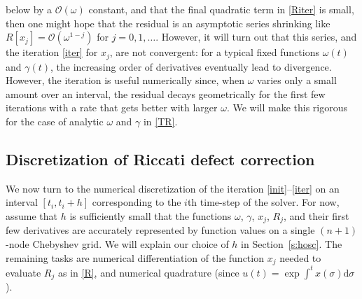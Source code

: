 \documentclass[10pt]{article}
\newcommand{\bigO}{{\mathcal O}}
\newcommand{\om}{\omega}
\newcommand{\g}{\gamma}
\begin{document}
below by a $\bigO(\om)$ constant,
and that the final quadratic term in \eqref{Riter} is small,
then one might hope that the
residual is an asymptotic series
shrinking like $R[x_j] = \bigO(\om^{1-j})$ for $j=0,1,\dots$.
However, it will turn out that this series, and the iteration \cref{iter} for $x_j$, are not convergent:
for a typical fixed functions $\om(t)$ and $\g(t)$,
the increasing order of derivatives eventually lead to divergence.
However, the iteration
is useful numerically since, when $\om$ varies only a small amount
over an interval,
the residual decays geometrically for the first few iterations with a rate that gets better with larger $\om$.
We will make this rigorous for the case of analytic $\om$ and $\g$
in \cref{TR}.

\subsection{Discretization of Riccati defect correction}

We now turn to the numerical discretization of
the iteration \eqref{init}--\eqref{iter} on an interval
$[t_i,t_i+h]$ corresponding to the $i$th time-step of the solver.
For now, assume that $h$ is sufficiently small that the functions
$\om$, $\g$, $x_j$, $R_j$, and their first few derivatives are accurately
represented by function values on a single $(n+1)$-node Chebyshev grid.
We will explain our choice of $h$ in Section~\ref{s:hosc}.
The remaining tasks are numerical differentiation of the function
$x_j$ needed to evaluate $R_j$ as in \eqref{R}, and
numerical quadrature (since $u(t) = \exp \int^t x(\sigma) \mathrm{d}\sigma$).
\end{document}
